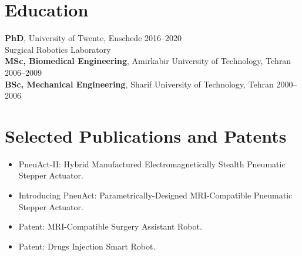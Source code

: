 \documentclass[11pt,a4paper]{article}
\begin{document}
\section{Education}
\textbf{PhD}, University of Twente, Enschede \hfill 2016--2020 \\
{\small Surgical Robotics Laboratory } \\[2pt]
\textbf{MSc, Biomedical Engineering}, Amirkabir University of Technology, Tehran \hfill 2006--2009 \\
\textbf{BSc, Mechanical Engineering}, Sharif University of Technology, Tehran \hfill 2000--2006

\section{Selected Publications and Patents}
\begin{itemize}
 \item PneuAct-II: Hybrid Manufactured Electromagnetically Stealth Pneumatic Stepper Actuator.
 \item Introducing PneuAct: Parametrically-Designed MRI-Compatible Pneumatic Stepper Actuator.
 \item Patent: MRI-Compatible Surgery Assistant Robot.
 \item Patent: Drugs Injection Smart Robot.
\end{itemize}
\end{document}
